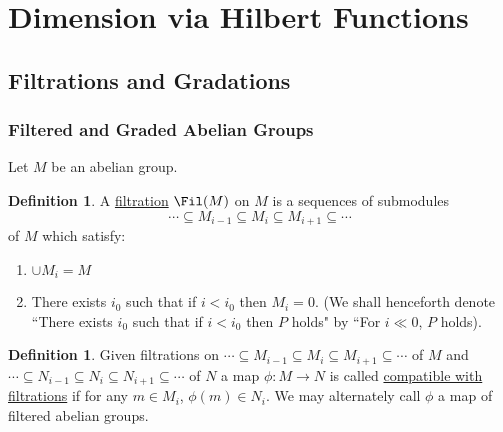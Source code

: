 \documentclass[12 pt]{article}
\theoremstyle{definition}
\newtheorem{defn}[thm]{Definition}
\renewcommand{\(}{\left(}
\renewcommand{\)}{\right)}
\begin{document}
\newpage




\section{Dimension via Hilbert Functions}

\subsection{Filtrations and Gradations}

\subsubsection{Filtered and Graded Abelian Groups}
Let $M$ be an abelian group.
\begin{defn} A \underline{filtration} $\Fil(M)$ on $M$ is a sequences of submodules
\[\cdots \subseteq M_{i-1} \subseteq M_i \subseteq M_{i+1} \subseteq \cdots\]
of $M$ which satisfy:
\begin{enumerate}
\item $\cup M_i=M$
\item There exists $i_0$ such that if $i<i_0$ then $M_i=0$. (We shall henceforth denote ``There exists $i_0$ such that if $i<i_0$ then $P$ holds" by ``For $i \ll 0$, $P$ holds).
\end{enumerate}
\end{defn}

\begin{defn} Given filtrations on $\cdots \subseteq M_{i-1} \subseteq M_i \subseteq M_{i+1} \subseteq \cdots $ of $M$ and $\cdots \subseteq N_{i-1} \subseteq N_i \subseteq N_{i+1} \subseteq \cdots$ of $N$ a map $\phi:M \to N$ is called \underline{compatible with filtrations} if for any $m \in M_i$, $\phi(m) \in N_i$. We may alternately call $\phi$ a map of filtered abelian groups.
\end{defn}
\end{document}
